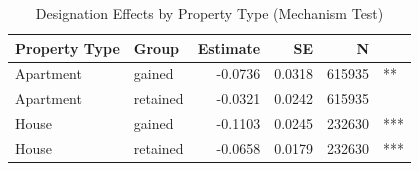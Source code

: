 \begin{table}

\caption{\label{tab:type_het}Designation Effects by Property Type (Mechanism Test)}
\centering
\begin{tabular}[t]{llrrrl}
\toprule
Property Type & Group & Estimate & SE & N & \\
\midrule
Apartment & gained & -0.0736 & 0.0318 & 615935 & **\\
Apartment & retained & -0.0321 & 0.0242 & 615935 & \\
House & gained & -0.1103 & 0.0245 & 232630 & ***\\
House & retained & -0.0658 & 0.0179 & 232630 & ***\\
\bottomrule
\end{tabular}
\end{table}
